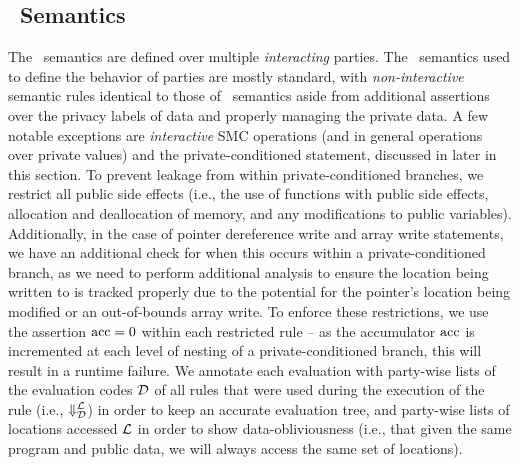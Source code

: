 
\subsection{\piccoC\ Semantics} \label{smc C descr}


The \piccoC\ semantics are defined over multiple {\em interacting} parties.
The \piccoC\ semantics used to define the behavior of 
parties are mostly standard, with \emph{non-interactive} semantic rules identical to those of \vanillaC\ semantics aside from additional assertions over the privacy labels of data and properly managing the private data. 
A few notable exceptions are \emph{interactive} SMC operations (and in general operations over private values)
and the private-conditioned  statement, discussed in later in this section.    
To prevent leakage from within private-conditioned branches, we restrict all public side effects (i.e., the use of functions with public side effects, allocation and deallocation of memory, and any modifications to public variables). 
Additionally, in the case of pointer dereference write and array write statements, we have an additional check for when this occurs within a private-conditioned branch, as we need to perform additional analysis to ensure the location being written to is tracked properly due to the potential for the pointer's location being modified or an out-of-bounds array write. 
To enforce these restrictions, we use the assertion $\mathrm{acc} = 0$ within each restricted rule -- as the accumulator $\mathrm{acc}$ is incremented at each level of nesting of a private-conditioned branch, this will result in a runtime failure. 
We annotate each evaluation with party-wise lists of the evaluation codes $\mathcal{D}$ of all rules that were used during the execution of the rule (i.e., $\Downarrow^{\mathcal{L}}_\mathit{\mathcal{D}}$) in order to keep an accurate evaluation tree, and party-wise lists of locations accessed $\mathcal{L}$ in order to show data-obliviousness (i.e., that given the same program and public data, we will always access the same set of locations). 


%
%
